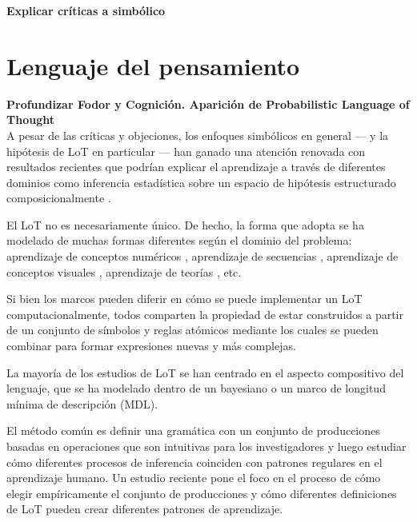 \textbf{Explicar críticas a simbólico} \cite{blackburn1984spreading, loewer1991meaning, knowles1998language, aydede1997language} \\


\section{Lenguaje del pensamiento}

\textbf{Profundizar Fodor y Cognición. Aparición de Probabilistic Language of Thought}\\

A pesar de las críticas y objeciones, los enfoques simbólicos en general --- y la hipótesis de LoT en particular --- han ganado una atención renovada con resultados recientes que podrían explicar el aprendizaje a través de diferentes dominios como inferencia estadística sobre un espacio de hipótesis estructurado composicionalmente \cite{tenenbaum2011grow, piantadosi2016four}.

El LoT no es necesariamente único. De hecho, la forma que adopta se ha modelado de muchas formas diferentes según el dominio del problema: aprendizaje de conceptos numéricos \cite{piantadosi2012bootstrapping}, aprendizaje de secuencias \cite{marie2016, yildirim2015learning, romano2013language}, aprendizaje de conceptos visuales \cite{ellis2015unsupervised}, aprendizaje de teorías \cite{ullman2012theory}, etc.

Si bien los marcos pueden diferir en cómo se puede implementar un LoT computacionalmente, todos comparten la propiedad de estar construidos a partir de un conjunto de símbolos y reglas atómicos mediante los cuales se pueden combinar para formar expresiones nuevas y más complejas. 

La mayoría de los estudios de LoT se han centrado en el aspecto compositivo del lenguaje, que se ha modelado dentro de un \cite{tenenbaum2011grow} bayesiano o un marco \cite{marie2016, goldsmith2002probabilistic, romano2013language, goldsmith2001unsupervised} de longitud mínima de descripción (MDL).

El método común es definir una gramática con un conjunto de producciones basadas en operaciones que son intuitivas para los investigadores y luego estudiar cómo diferentes procesos de inferencia coinciden con patrones regulares en el aprendizaje humano. Un estudio reciente \cite{piantadosi2016logical} pone el foco en el proceso de cómo elegir empíricamente el conjunto de producciones y cómo diferentes definiciones de LoT pueden crear diferentes patrones de aprendizaje. 

